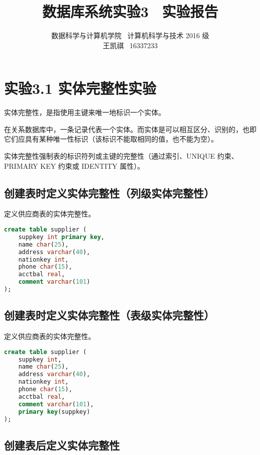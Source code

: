 \documentclass{article}
\begin{document}
\title{数据库系统实验3 \ 实验报告}
\author {数据科学与计算机学院 \ 计算机科学与技术 2016 级 \\ 王凯祺 \ 16337233}
\maketitle

\section{实验3.1 实体完整性实验}

实体完整性，是指使用主键来唯一地标识一个实体。

在关系数据库中，一条记录代表一个实体。而实体是可以相互区分、识别的，也即它们应具有某种唯一性标识（该标识不能取相同的值，也不能为空）。

实体完整性强制表的标识符列或主键的完整性（通过索引、UNIQUE 约束、PRIMARY KEY 约束或 IDENTITY 属性）。

\subsection{创建表时定义实体完整性（列级实体完整性）}

定义供应商表的实体完整性。

\begin{lstlisting}[language=sql]
create table supplier (
	suppkey int primary key,
    name char(25),
    address varchar(40),
    nationkey int,
    phone char(15),
    acctbal real,
    comment varchar(101)
);
\end{lstlisting}

\subsection{创建表时定义实体完整性（表级实体完整性）}

定义供应商表的实体完整性。

\begin{lstlisting}[language=sql]
create table supplier (
	suppkey int,
    name char(25),
    address varchar(40),
    nationkey int,
    phone char(15),
    acctbal real,
    comment varchar(101),
    primary key(suppkey)
);
\end{lstlisting}

\subsection{创建表后定义实体完整性}
\end{document}
